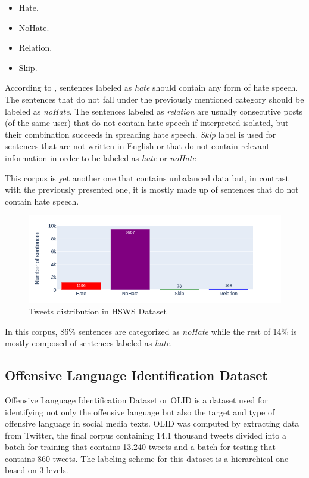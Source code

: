 \documentclass[12pt,a4paper]{report}
\begin{document}
\begin{itemize}
    \item Hate.
    \item NoHate.
    \item Relation.
    \item Skip.
\end{itemize}

According to \citet{davidson2017automated}, sentences labeled as \textit{hate} should contain any form of hate speech. The sentences that do not fall under the previously mentioned category should be labeled as \textit{noHate}. The sentences labeled as \textit{relation} are usually consecutive posts (of the same user) that do not contain hate speech if interpreted isolated, but their combination succeeds in spreading hate speech. \textit{Skip} label is used for sentences that are not written in English or that do not contain relevant information in order to be labeled as \textit{hate} or \textit{noHate}

This corpus is yet another one that contains unbalanced data but, in contrast with the previously presented one, it is mostly made up of sentences that do not contain hate speech.

\begin{figure}[H]
\centering
\includegraphics[width=18cm]{pics/HSWS.png}
  \caption{Tweets distribution in HSWS Dataset}
  \label{fig:HSWS}
\end{figure}

In this corpus, 86\% sentences are categorized as \textit{noHate} while the rest of 14\% is mostly composed of sentences labeled as \textit{hate}.

\subsection{Offensive Language Identification Dataset}
Offensive Language Identification Dataset \citep{zampieri2019semeval} or OLID is a dataset used for identifying not only the offensive language but also the target and type of offensive language in social media texts. OLID was computed by extracting data from Twitter, the final corpus containing 14.1 thousand tweets divided into a batch for training that contains 13.240 tweets and a batch for testing that contains 860 tweets. The labeling scheme for this dataset is a hierarchical one based on 3 levels.
\end{document}
